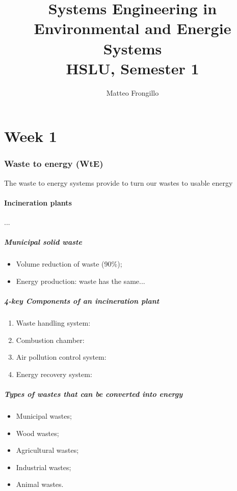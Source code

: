 \documentclass{article}
\title{\textbf{Systems Engineering in\\Environmental and Energie Systems\\ HSLU, Semester 1}}
\author{Matteo Frongillo}
\begin{document}
\maketitle
\tableofcontents
\pagebreak

\part{Week 1}

\section{Waste to energy (WtE)}
The waste to energy systems provide to turn our wastes to usable energy

\subsection{Incineration plants}
...

\subsubsection{Municipal solid waste}
\begin{itemize}
    \item Volume reduction of waste (90\%);
    \item Energy production: waste has the same...
\end{itemize}

\subsubsection{4-key Components of an incineration plant}
\begin{enumerate}
    \item Waste handling system:
    \item Combustion chamber:
    \item Air pollution control system:
    \item Energy recovery system:
\end{enumerate}

\subsubsection{Types of wastes that can be converted into energy}
\begin{itemize}
    \item Municipal wastes;
    \item Wood wastes;
    \item Agricultural wastes;
    \item Industrial wastes;
    \item Animal wastes.
\end{itemize}
\end{document}
